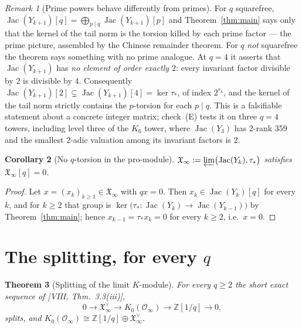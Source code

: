 \documentclass[11pt]{amsart}
\numberwithin{equation}{section}
\newtheorem{theorem}{Theorem}[section]
\newtheorem{corollary}[theorem]{Corollary}
\theoremstyle{definition}
\theoremstyle{remark}
\newtheorem{remark}[theorem]{Remark}
\newcommand{\Z}{\mathbb{Z}}
\newcommand{\cO}{\mathcal{O}}
\newcommand{\XX}{\mathfrak{X}_\infty}
\newcommand{\Jac}{\operatorname{Jac}}
\newcommand{\ta}{\tau_*}
\begin{document}
\begin{remark}[Prime powers behave differently from primes]\label{rem:powers}
For $q$ squarefree, $\Jac(Y_{k+1})[q]=\bigoplus_{p\mid q}\Jac(Y_{k+1})[p]$ and
Theorem~\ref{thm:main} says only that the kernel of the tail norm is the torsion killed by
each prime factor --- the prime picture, assembled by the Chinese remainder theorem. For
$q$ \emph{not} squarefree the theorem says something with no prime analogue. At $q=4$ it
asserts that $\Jac(Y_{k+1})$ has \emph{no element of order exactly $2$}: every invariant
factor divisible by $2$ is divisible by $4$. Consequently
$\Jac(Y_{k+1})[2]\subsetneq\Jac(Y_{k+1})[4]=\ker\ta$, of index $2^{r_k}$, and the kernel of
the tail norm strictly contains the $p$-torsion for each $p\mid q$. This is a falsifiable
statement about a concrete integer matrix; check~(E) tests it on three $q=4$ towers,
including level three of the $K_6$ tower, where $\Jac(Y_3)$ has $2$-rank $359$ and the
smallest $2$-adic valuation among its invariant factors is $2$.
\end{remark}

\begin{corollary}[No $q$-torsion in the pro-module]\label{cor:notorsion}
$\XX:=\varprojlim\bigl(\Jac(Y_k),\ta\bigr)$ satisfies $\XX[q]=0$.
\end{corollary}

\begin{proof}
Let $x=(x_k)_{k\ge1}\in\XX$ with $qx=0$. Then $x_k\in\Jac(Y_k)[q]$ for every $k$, and for
$k\ge2$ that group is $\ker\bigl(\ta\colon\Jac(Y_k)\to\Jac(Y_{k-1})\bigr)$ by
Theorem~\ref{thm:main}; hence $x_{k-1}=\ta x_k=0$ for every $k\ge2$, i.e.\ $x=0$.
\end{proof}

\section{The splitting, for every \texorpdfstring{$q$}{q}}\label{sec:split}

\begin{theorem}[Splitting of the limit $K$-module]\label{thm:split}
For every $q\ge2$ the short exact sequence of [VIII, Thm.~3.3(iii)],
\[
0\longrightarrow\XX^{\vee}\longrightarrow K_0(\cO_\infty)\longrightarrow\Z[1/q]
\longrightarrow0,
\]
splits, and $K_0(\cO_\infty)\cong\Z[1/q]\oplus\XX^{\vee}$.
\end{theorem}
\end{document}
